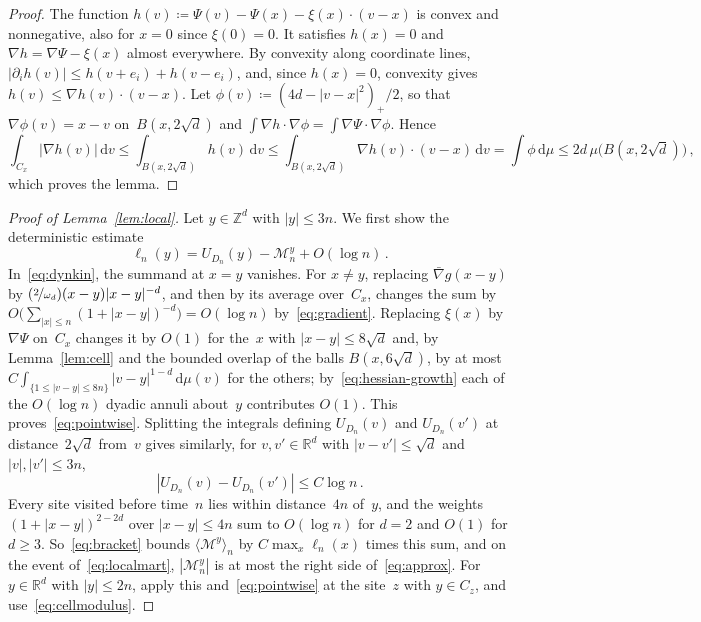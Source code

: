 \documentclass[11pt]{amsart}
\theoremstyle{plain}
\theoremstyle{definition}
\newcommand{\Z}{\mathbb Z}
\newcommand{\R}{\mathbb R}
\newcommand{\gauge}{\Psi}
\newcommand{\dd}{\,\mathrm d}
\newcommand{\nf}{\nicefrac}
\numberwithin{equation}{section}
\begin{document}
\begin{proof}
The function $h(v)\coloneqq \gauge(v)-\gauge(x)-\xi(x)\cdot(v-x)$ is convex and nonnegative, also for $x=0$ since $\xi(0)=0$. It satisfies $h(x)=0$ and $\nabla h=\nabla \gauge-\xi(x)$ almost everywhere. By convexity along coordinate lines, $|\partial_ih(v)|\leq h(v+e_i)+h(v-e_i)$, and, since $h(x)=0$, convexity gives $h(v)\leq\nabla h(v)\cdot(v-x)$. Let $\phi(v)\coloneqq(4d-|v-x|^2)_+/2$, so that $\nabla\phi(v)=x-v$ on~$B(x,2\sqrt d)$ and $\int\nabla h\cdot\nabla\phi=\int\nabla\gauge\cdot\nabla\phi$. Hence
\begin{equation*}
\int_{C_x}|\nabla h(v)|\dd v\leq\int_{B(x,2\sqrt d)}h(v)\dd v\leq\int_{B(x,2\sqrt d)}\nabla h(v)\cdot(v-x)\dd v=\int\phi\dd\mu\leq2d\,\mu\bigl(B(x,2\sqrt d)\bigr)\, ,
\end{equation*}
which proves the lemma.
\end{proof}

\begin{proof}[Proof of Lemma~\ref{lem:local}]
Let $y\in\Z^d$ with $|y|\leq3n$. We first show the deterministic estimate
\begin{equation}\label{eq:pointwise}
\ell_n(y)=U_{D_n}(y)-\mathcal M_n^y+O(\log n)\, .
\end{equation}
In~\eqref{eq:dynkin}, the summand at $x=y$ vanishes. For $x\neq y$, replacing $\bar\nabla g(x-y)$ by $(\nf{2}{\omega_d})(x-y)|x-y|^{-d}$, and then by its average over~$C_x$, changes the sum by $O\bigl(\sum_{|x|\leq n}(1+|x-y|)^{-d}\bigr)=O(\log n)$ by~\eqref{eq:gradient}. Replacing $\xi(x)$ by $\nabla\gauge$ on~$C_x$ changes it by $O(1)$ for the~$x$ with $|x-y|\leq8\sqrt d$ and, by Lemma~\ref{lem:cell} and the bounded overlap of the balls $B(x,6\sqrt d)$, by at most $C\int_{\{1\leq|v-y|\leq8n\}}|v-y|^{1-d}\dd\mu(v)$ for the others; by~\eqref{eq:hessian-growth} each of the $O(\log n)$ dyadic annuli about~$y$ contributes $O(1)$. This proves~\eqref{eq:pointwise}. Splitting the integrals defining $U_{D_n}(v)$ and $U_{D_n}(v')$ at distance~$2\sqrt d$ from~$v$ gives similarly, for $v,v'\in\R^d$ with $|v-v'|\leq\sqrt d$ and $|v|,|v'|\leq3n$,
\begin{equation}\label{eq:cellmodulus}
|U_{D_n}(v)-U_{D_n}(v')|\leq C\log n\, .
\end{equation}
Every site visited before time~$n$ lies within distance~$4n$ of~$y$, and the weights $(1+|x-y|)^{2-2d}$ over $|x-y|\leq4n$ sum to $O(\log n)$ for $d=2$ and $O(1)$ for $d\geq3$. So~\eqref{eq:bracket} bounds $\langle\mathcal M^y\rangle_n$ by $C\max_x\ell_n(x)$ times this sum, and on the event of~\eqref{eq:localmart}, $|\mathcal M^y_n|$ is at most the right side of~\eqref{eq:approx}. For $y\in\R^d$ with $|y|\leq2n$, apply this and~\eqref{eq:pointwise} at the site~$z$ with $y\in C_z$, and use~\eqref{eq:cellmodulus}.
\end{proof}
\end{document}

